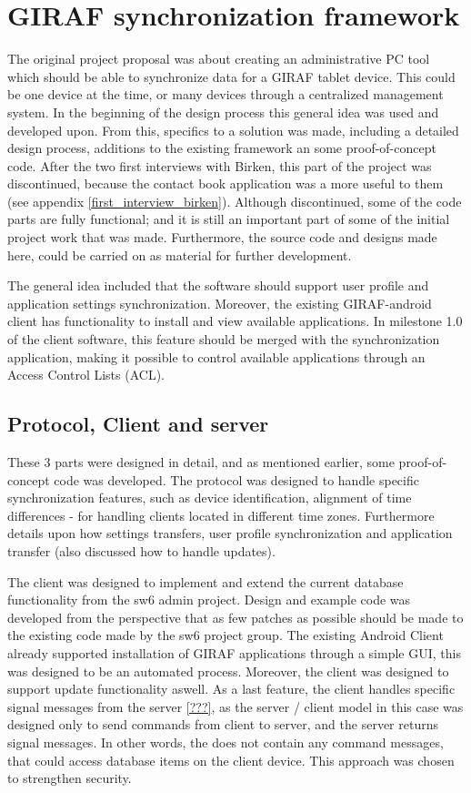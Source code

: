 \section{GIRAF synchronization framework}
The original project proposal was about creating an administrative PC tool which should be able to synchronize data for a GIRAF tablet device. This could be one device at the time, or many devices through a centralized management system. In the beginning of the design process this general idea was used and developed upon. From this, specifics to a solution was made, including a detailed design process, additions to the existing framework an some proof-of-concept code. After the two first interviews with Birken, this part of the project was discontinued, because the contact book application was a more useful to them (see appendix \vref{first_interview_birken}). Although discontinued, some of the code parts are fully functional; and it is still an important part of some of the initial project work that was made. Furthermore, the source code and designs made here, could be carried on as material for further development. 

The general idea included that the software should support user profile and application settings synchronization. Moreover, the existing GIRAF-android client has functionality to install and view available applications. In milestone 1.0 of the client software, this feature should be merged with the synchronization application, making it possible to control available applications through an Access Control Lists (ACL).

\subsection{Protocol, Client and server}
These 3 parts were designed in detail, and as mentioned earlier, some proof-of-concept code was developed. The protocol was designed to handle specific synchronization features, such as device identification, alignment of time differences - for handling clients located in different time zones. Furthermore details upon how settings transfers, user profile synchronization and application transfer (also discussed how to handle updates).  

The client was designed to implement and extend the current database functionality from the sw6 admin project. Design and example code was developed from the perspective that as few patches as possible should be made to the existing code made by the sw6 project group.
The existing Android Client already supported installation of GIRAF applications through a simple GUI, this  was designed to be an automated process. Moreover, the client was designed to support update functionality aswell. As a last feature, the client handles specific signal messages from the server \vref{???}, as the server / client model in this case was designed only to send commands from client to server, and the server returns signal messages. In other words, the does not contain any command messages, that could access database items on the client device. This approach was chosen to strengthen security.  

